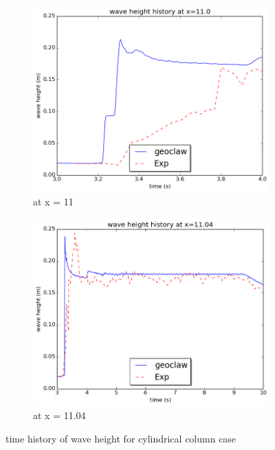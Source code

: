 \documentclass[11pt]{article}
\begin{document}
\begin{figure}[h!]
    \centering
    \begin{subfigure}[b]{0.4\textwidth}
        \includegraphics[width=1\textwidth]{./plots/waveheight_cylinder_x11}
        \caption{at x = 11}
        \label{fig:waveheight_cylinder_x=11.0}
    \end{subfigure}
    \begin{subfigure}[b]{0.4\textwidth}
        \includegraphics[width=1\textwidth]{./plots/waveheight_cylinder_x1104_largerTimeScale}
        \caption{at x = 11.04}
        \label{fig:waveheight_cylinder_x=11.04}
    \end{subfigure}
    \caption{time history of wave height for cylindrical column case}
\end{figure}
\end{document}
